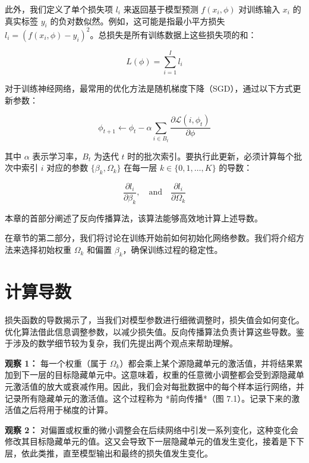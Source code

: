\documentclass[lang=cn,newtx,10pt,scheme=chinese]{elegantbook}
\begin{document}
此外，我们定义了单个损失项 \(l_i\) 来返回基于模型预测 \(f(x_i, \phi)\) 对训练输入 \(x_i\) 的真实标签 \(y_i\) 的负对数似然。例如，这可能是指最小平方损失 \(l_i = (f(x_i, \phi) - y_i)^2\)。总损失是所有训练数据上这些损失项的和：

\begin{equation}
L(\phi) = \sum_{i=1}^{I} l_i 
\end{equation}

对于训练神经网络，最常用的优化方法是随机梯度下降（SGD），通过以下方式更新参数：

\begin{equation}
\phi_{t+1} \leftarrow \phi_t - \alpha \sum_{i \in B_t} \frac{\partial \mathcal{L}(i,\phi_t)}{\partial \phi} 
\end{equation}


其中 \(\alpha\) 表示学习率，\(B_t\) 为迭代 \(t\) 时的批次索引。要执行此更新，必须计算每个批次中索引 \(i\) 对应的参数 \(\{\beta_k, \Omega_k\}\) 在每一层 \(k \in \{0, 1, \ldots, K\}\) 的导数：

\begin{equation}
\frac{\partial l_i}{\partial \beta_k}, \quad \text{and} \quad \frac{\partial l_i}{\partial \Omega_k} 
\end{equation}

本章的首部分阐述了反向传播算法，该算法能够高效地计算上述导数。

在章节的第二部分，我们将讨论在训练开始前如何初始化网络参数。我们将介绍方法来选择初始权重 \(\Omega_k\) 和偏置 \(\beta_k\)，确保训练过程的稳定性。
\section{计算导数}

损失函数的导数揭示了，当我们对模型参数进行细微调整时，损失值会如何变化。优化算法借此信息调整参数，以减少损失值。反向传播算法负责计算这些导数。鉴于涉及的数学细节较为复杂，我们先提出两个观点来帮助理解。

\textbf{观察 1：} 每一个权重（属于 \(\Omega_k\)）都会乘上某个源隐藏单元的激活值，并将结果累加到下一层的目标隐藏单元中。这意味着，权重的任意微小调整都会受到源隐藏单元激活值的放大或衰减作用。因此，我们会对每批数据中的每个样本运行网络，并记录所有隐藏单元的激活值。这个过程称为 *前向传播*（图 7.1）。记录下来的激活值之后将用于梯度的计算。

\textbf{观察 2：} 对偏置或权重的微小调整会在后续网络中引发一系列变化，这种变化会修改其目标隐藏单元的值。这又会导致下一层隐藏单元的值发生变化，接着是下下层，依此类推，直至模型输出和最终的损失值发生变化。
\end{document}
